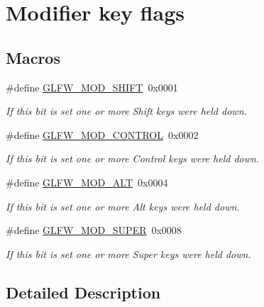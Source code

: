 \hypertarget{group__mods}{\section{Modifier key flags}
\label{group__mods}
}
\subsection*{Macros}
\begin{DoxyCompactItemize}
\item 
\#define \hyperlink{group__mods_ga14994d3196c290aaa347248e51740274}{G\-L\-F\-W\-\_\-\-M\-O\-D\-\_\-\-S\-H\-I\-F\-T}~0x0001
\begin{DoxyCompactList}\small\item\em If this bit is set one or more Shift keys were held down. \end{DoxyCompactList}\item 
\#define \hyperlink{group__mods_ga6ed94871c3208eefd85713fa929d45aa}{G\-L\-F\-W\-\_\-\-M\-O\-D\-\_\-\-C\-O\-N\-T\-R\-O\-L}~0x0002
\begin{DoxyCompactList}\small\item\em If this bit is set one or more Control keys were held down. \end{DoxyCompactList}\item 
\#define \hyperlink{group__mods_gad2acd5633463c29e07008687ea73c0f4}{G\-L\-F\-W\-\_\-\-M\-O\-D\-\_\-\-A\-L\-T}~0x0004
\begin{DoxyCompactList}\small\item\em If this bit is set one or more Alt keys were held down. \end{DoxyCompactList}\item 
\#define \hyperlink{group__mods_ga6b64ba10ea0227cf6f42efd0a220aba1}{G\-L\-F\-W\-\_\-\-M\-O\-D\-\_\-\-S\-U\-P\-E\-R}~0x0008
\begin{DoxyCompactList}\small\item\em If this bit is set one or more Super keys were held down. \end{DoxyCompactList}\end{DoxyCompactItemize}


\subsection{Detailed Description}


